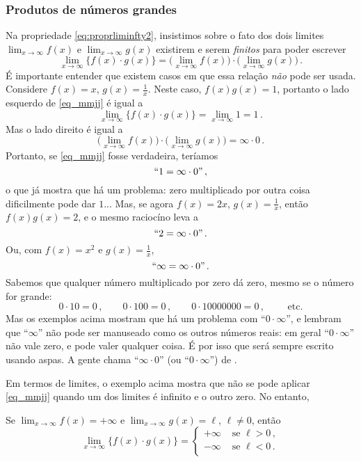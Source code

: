 \subsubsection{Produtos de números grandes}
Na propriedade \eqref{eq:proprliminfty2},
insistimos sobre o fato dos dois limites
$\lim_{x\to\infty}f(x)$  e $\lim_{x\to\infty}g(x)$ existirem e serem
\emph{finitos} para poder escrever
\begin{equation}\label{eq_mmjj}
\lim_{x\to\infty}\{f(x)\cdot g(x)\}=
\bigl(\lim_{x\to\infty}f(x)\bigr)\cdot\bigl(\lim_{x\to\infty}g(x)\bigr)\,.
\end{equation}
É importante entender que existem casos em que essa relação \emph{não}
pode ser usada.\\

Considere  $f(x)=x$, $g(x)=\frac{1}{x}$. Neste caso, $f(x)g(x)=1$,
portanto o lado esquerdo de 
\eqref{eq_mmjj} é igual a
\[ 
\lim_{x\to\infty}\{f(x)\cdot g(x)\}=
\lim_{x\to\infty}1=1\,.
\]
Mas o lado direito  é igual a
\[ 
\bigl(\lim_{x\to\infty}f(x)\bigr)\cdot\bigl(\lim_{x\to\infty}g(x)\bigr)=\infty\cdot
0\,.
\]
Portanto, se \eqref{eq_mmjj} fosse verdadeira, teríamos 
\[``1=\infty\cdot 0"\,,\]
o que já mostra que há um problema: zero multiplicado por outra coisa
dificilmente pode dar $1$...
Mas, se agora $f(x)=2x$, $g(x)=\frac1x$, então $f(x)g(x)=2$, e 
o mesmo raciocíno leva a 
\[``2=\infty\cdot 0"\,.  \]
Ou, com $f(x)=x^2$ e $g(x)=\frac1x$,
\[``\infty=\infty\cdot 0"\,.\]
Sabemos que qualquer número multiplicado por zero dá zero, mesmo se o número for
grande:
\[ 
0\cdot 10=0\,,\quad\quad
0\cdot 100=0\,,\quad\quad
0\cdot 10000000=0\,,\quad\quad
\text{ etc.}
\]
Mas os exemplos acima mostram que há um problema com 
``$0\cdot\infty$'', e 
lembram que ``$\infty$'' não pode ser manuseado como os
outros números reais: em geral ``$0\cdot \infty$'' não vale zero, e
pode valer qualquer coisa. 
É por isso que será sempre escrito usando aspas.
A gente chama ``$\infty\cdot 0$'' (ou ``$0\cdot \infty$'') 
de .

Em termos de limites, o exemplo acima 
mostra que não se pode aplicar \eqref{eq_mmjj}
quando um dos limites é infinito e o outro zero. No entanto, 

\begin{pro}\label{prop_LIM_produtouminfinito}
Se $\lim_{x\to\infty}f(x)=+\infty$ e $\lim_{x\to\infty}g(x)=\ell$, 
$\ell\neq 0$, então 
\[ 
\lim_{x\to\infty}\{f(x)\cdot g(x)\}=
\begin{cases}
+\infty&\text{ se }\ell>0\,,\\
-\infty&\text{ se }\ell<0\,.\\
\end{cases}
\]
\end{pro}

